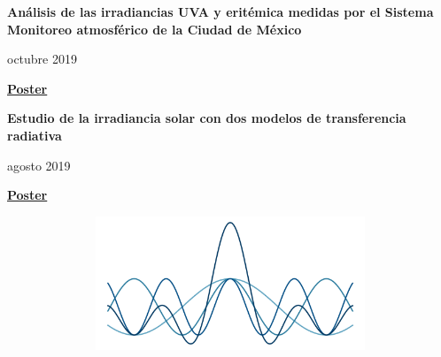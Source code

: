 \documentclass[a3paper]{adcv_color}
\newenvironment{proyects}[2]{\begin{minipage}{0.8\linewidth}\textbf{#1}
\end{minipage}\begin{minipage}{0.2\linewidth}
    \begin{flushright}
      #2
}{\end{flushright}
  \end{minipage}}
\begin{document}
\begin{multicols}{2}
  \begin{proyects}{Análisis de las irradiancias UVA y eritémica medidas por el Sistema Monitoreo atmosférico de la Ciudad de México}{octubre 2019}
  \end{proyects}

  \href{https://github.com/giovannilopez9808/Posters_templates/blob/master/2019/AFA/Analisis\%20indice\%20UV/Analisis\%20de\%20irradiancia.pdf}{\textbf{Poster}}

  \begin{proyects}{Estudio de la irradiancia solar con dos modelos de transferencia radiativa}{agosto 2019}
  \end{proyects}

  \href{https://github.com/giovannilopez9808/Posters_templates/tree/master/2019/CNF/Transferencia\%20radiativa}{\textbf{Poster}}
\end{multicols}
\begin{minipage}{1\linewidth}
  \hspace*{-4cm}
  \includegraphics[height=4cm,width=33cm]{image.png}
\end{minipage}
\end{document}
